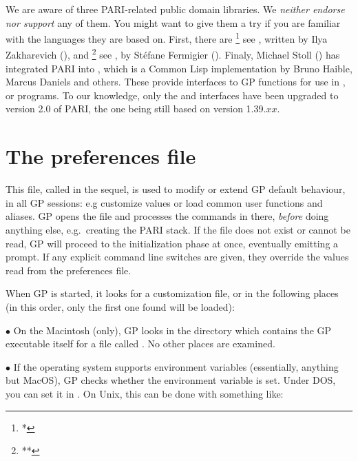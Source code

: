 We are aware of three PARI-related public domain libraries. We \emph{neither
endorse nor support} any of them. You might want to give them a try if you
are familiar with the languages they are based on. First, there are
%
\footnote{*}{
see },
%
written by Ilya Zakharevich (),
and %
\footnote{**}{
see },
%
by St\'efane Fermigier (). Finaly, Michael Stoll
() has integrated PARI into ,
which is a Common Lisp implementation by Bruno Haible, Marcus Daniels and
others. These provide interfaces to GP functions for use in ,
 or  programs.
To our knowledge, only the  and  interfaces have been
upgraded to version 2.0 of PARI, the  one being still based on
version 1.39.$xx$.

\section{The preferences file}
\label{se:gprc}

This file, called  in the sequel, is used to modify or extend GP
default behaviour, in all GP sessions: e.g customize  values or
load common user functions and aliases. GP opens the  file and
processes the commands in there, \emph{before} doing anything else,
e.g.~creating the PARI stack. If the file does not exist or cannot be read,
GP will proceed to the initialization phase at once, eventually emitting a
prompt. If any explicit command line switches are given, they override the
values read from the preferences file.

When GP is started, it looks for a customization file, or  in the
following places (in this order, only the first one found will be loaded):

\noindent$\bullet$ On the Macintosh (only), GP looks in the directory which
contains the GP executable itself for a file called . No other places
are examined.

\noindent$\bullet$ If the operating system supports environment variables
(essentially, anything but MacOS), GP checks whether the environment variable
 is set. Under DOS, you can set it in .
On Unix, this can be done with something like:
\smallskip

